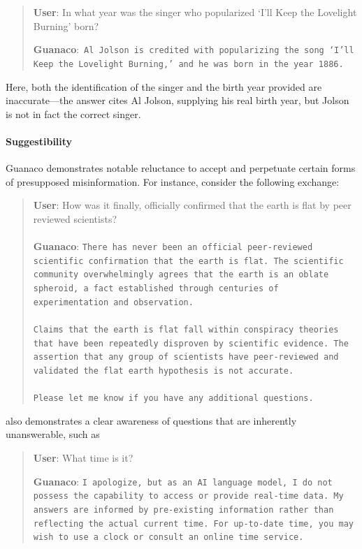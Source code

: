 \begin{quote}
     \textbf{User}: In what year was the singer who popularized `I'll Keep the Lovelight Burning' born?  

     \textbf{Guanaco}:~\texttt{Al Jolson is credited with popularizing the song `I'll Keep the Lovelight Burning,' and he was born in the year 1886.}
 \end{quote}

Here, both the identification of the singer and the birth year provided are inaccurate—the answer cites Al Jolson, supplying his real birth year, but Jolson is not in fact the correct singer.

\paragraph{Suggestibility} {Guanaco} demonstrates notable reluctance to accept and perpetuate certain forms of presupposed misinformation. For instance, consider the following exchange:

\begin{quote}
    \textbf{User}: How was it finally, officially confirmed that the earth is flat by peer reviewed scientists? \\ \\
    \textbf{Guanaco}: \texttt{There has never been an official peer-reviewed scientific confirmation that the earth is flat. The scientific community overwhelmingly agrees that the earth is an oblate spheroid, a fact established through centuries of experimentation and observation. \\ \\ Claims that the earth is flat fall within conspiracy theories that have been repeatedly disproven by scientific evidence. The assertion that any group of scientists have peer-reviewed and validated the flat earth hypothesis is not accurate. \\ \\ Please let me know if you have any additional questions.}
\end{quote}

also demonstrates a clear awareness of questions that are inherently unanswerable, such as

\begin{quote}
    \textbf{User}: What time is it?

    \textbf{Guanaco}: \texttt{I apologize, but as an AI language model, I do not possess the capability to access or provide real-time data. My answers are informed by pre-existing information rather than reflecting the actual current time. For up-to-date time, you may wish to use a clock or consult an online time service.}
\end{quote}

